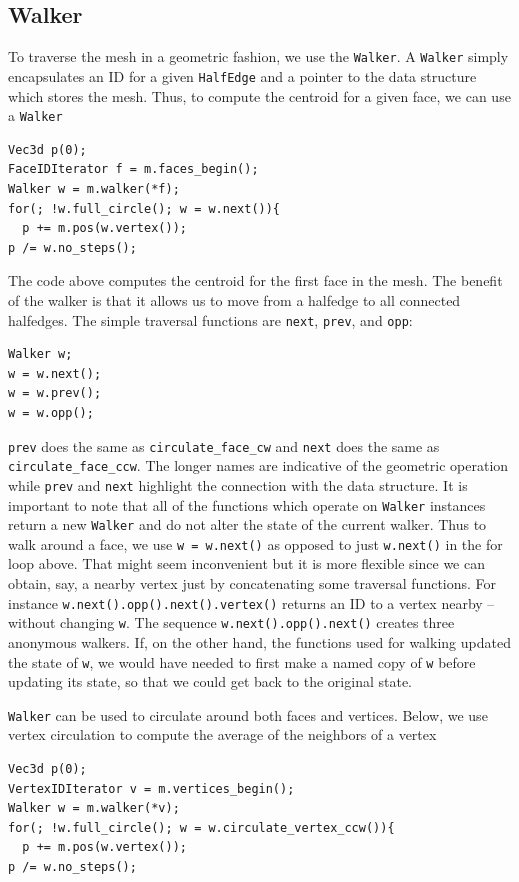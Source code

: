 \documentclass[a4paper]{article}
\begin{document}
\subsection{Walker}
To traverse the mesh in a geometric fashion, we use the \texttt{Walker}. A \texttt{Walker} simply encapsulates an ID for a given \texttt{HalfEdge} and a pointer to the data structure which stores the mesh. Thus, to compute the centroid for a given face, we can use a \texttt{Walker}
\begin{verbatim}
Vec3d p(0);
FaceIDIterator f = m.faces_begin();
Walker w = m.walker(*f);
for(; !w.full_circle(); w = w.next()){
  p += m.pos(w.vertex()); 
p /= w.no_steps();
\end{verbatim}
The code above computes the centroid for the first face in the mesh. The benefit of the walker is that it allows us to move from a halfedge to all connected halfedges. The simple traversal functions are \texttt{next}, \texttt{prev}, and \texttt{opp}:
\begin{verbatim}
Walker w;
w = w.next(); 
w = w.prev();
w = w.opp();
\end{verbatim}
\texttt{prev} does the same as \texttt{circulate\_face\_cw} and \texttt{next} does the same as \\\texttt{circulate\_face\_ccw}. The longer names are indicative of the geometric operation while \texttt{prev} and \texttt{next} highlight the connection with the data structure.    It is important to note that all of the functions which operate on \texttt{Walker} instances return a new \texttt{Walker} and do not alter the state of the current walker. Thus to walk around a face, we use \texttt{w = w.next()} as opposed to just \texttt{w.next()} in the for loop above. 
That might seem inconvenient but it is more flexible since we can obtain, say, a nearby vertex just by concatenating some traversal functions. For instance \texttt{w.next().opp().next().vertex()} returns an ID to a vertex nearby  -- without changing \texttt{w}. The sequence \texttt{w.next().opp().next()} creates three anonymous walkers. If, on the other hand, the functions used for walking updated the state of  \texttt{w}, we would have needed to first make a named copy of \texttt{w} before updating its state, so that we could get back to the original state.

\texttt{Walker} can be used to circulate around both faces and vertices. Below, we use vertex circulation to compute the average of the neighbors of a vertex
\begin{verbatim}
Vec3d p(0);
VertexIDIterator v = m.vertices_begin();
Walker w = m.walker(*v);
for(; !w.full_circle(); w = w.circulate_vertex_ccw()){
  p += m.pos(w.vertex()); 
p /= w.no_steps();
\end{verbatim}
\end{document}
